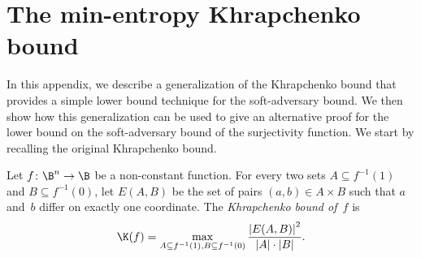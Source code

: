 \section{\label{sec:min-khrapchenko}The min-entropy Khrapchenko bound}

In this appendix, we describe a generalization of the Khrapchenko
bound that provides a simple %
lower bound technique for %
the soft-adversary
bound. We then show how this generalization can be used to give an
alternative proof for the lower bound on the soft-adversary bound
of the surjectivity function. We start by recalling the original Khrapchenko
bound.
\begin{repdefinition}{}
Let $f\colon\B^{n}\to\B$ be a non-constant function. For every two
sets $A\subseteq f^{-1}(1)$ and $B\subseteq f^{-1}(0)$, let $E(A,B)$
be the set of pairs $(a,b)\in A\times B$ such that $a$ and~$b$
differ on exactly one coordinate. The \emph{Khrapchenko bound of~$f$}
is 
\[
\K(f)=\max_{A\subseteq f^{-1}(1),B\subseteq f^{-1}(0)}\frac{\left|E(A,B)\right|^{2}}{\left|A\right|\cdot\left|B\right|}.
\]
\end{repdefinition}

